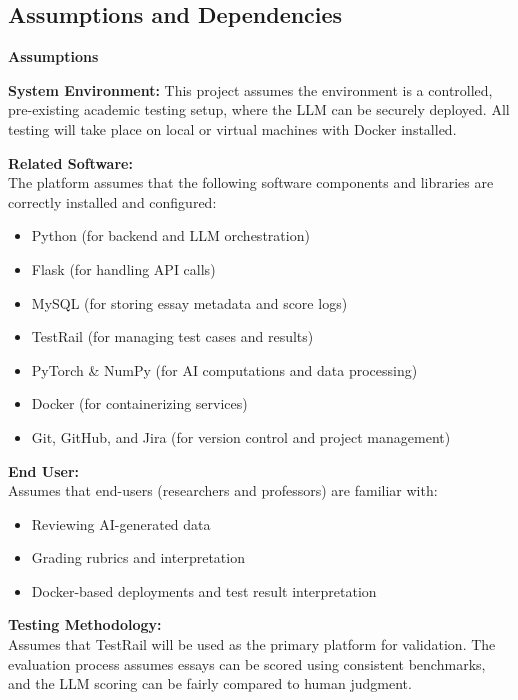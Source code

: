 \documentclass[12pt]{article}
\begin{document}
\subsection{Assumptions and Dependencies}

\textbf{Assumptions}

\textbf{System Environment:} This project assumes the environment is a controlled, pre-existing academic testing setup, where the LLM can be securely deployed. All testing will take place on local or virtual machines with Docker installed.

\vspace{1em}

\textbf{Related Software:}\\
The platform assumes that the following software components and libraries are correctly installed and configured:
\begin{itemize}
    \item Python (for backend and LLM orchestration)
    \item Flask (for handling API calls)
    \item MySQL (for storing essay metadata and score logs)
    \item TestRail (for managing test cases and results)
    \item PyTorch \& NumPy (for AI computations and data processing)
    \item Docker (for containerizing services)
    \item Git, GitHub, and Jira (for version control and project management)
\end{itemize}

\vspace{1em}

\textbf{End User:}\\
Assumes that end-users (researchers and professors) are familiar with:
\begin{itemize}
    \item Reviewing AI-generated data
    \item Grading rubrics and interpretation
    \item Docker-based deployments and test result interpretation
\end{itemize}

\vspace{1em}

\textbf{Testing Methodology:}\\
Assumes that TestRail will be used as the primary platform for validation. The evaluation process assumes essays can be scored using consistent benchmarks, and the LLM scoring can be fairly compared to human judgment.
\end{document}

